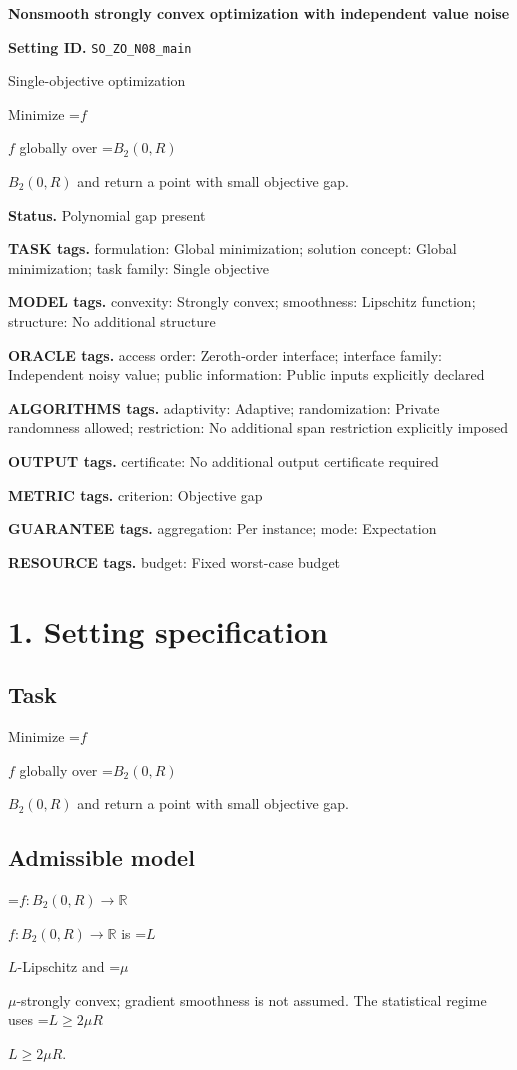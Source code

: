 \documentclass[10pt,a4paper]{article}
\newcommand{\AtlasMath}[1]{\par\begingroup\centering\setbox0=\hbox{$\displaystyle #1$}\ifdim\wd0>1.4\linewidth\typeout{ATLAS WIDE FORMULA: \the\wd0}\fi\ifdim\wd0>\linewidth\resizebox{\linewidth}{!}{\box0}\else\box0\fi\par\endgroup}
\newcommand{\AtlasInlineMath}[1]{\begingroup\setbox0=\hbox{$#1$}\ifdim\wd0>.4\linewidth\endgroup\AtlasMath{#1}\else\endgroup$#1$\fi}
\begin{document}
\raggedright

{\LARGE\bfseries\sffamily\color{AtlasNavy} Nonsmooth strongly convex optimization with independent value noise\par}\vspace{5pt}
\textbf{Setting ID.} \texttt{SO\_\allowbreak{}ZO\_\allowbreak{}N08\_\allowbreak{}main}

Single-objective optimization

Minimize \AtlasInlineMath{f} globally over \AtlasInlineMath{B_2(0,R)} and return a point with small objective gap.

\textbf{Status.} Polynomial gap present

\textbf{TASK tags.} formulation: Global minimization; solution concept: Global minimization; task family: Single objective

\textbf{MODEL tags.} convexity: Strongly convex; smoothness: Lipschitz function; structure: No additional structure

\textbf{ORACLE tags.} access order: Zeroth-order interface; interface family: Independent noisy value; public information: Public inputs explicitly declared

\textbf{ALGORITHMS tags.} adaptivity: Adaptive; randomization: Private randomness allowed; restriction: No additional span restriction explicitly imposed

\textbf{OUTPUT tags.} certificate: No additional output certificate required

\textbf{METRIC tags.} criterion: Objective gap

\textbf{GUARANTEE tags.} aggregation: Per instance; mode: Expectation

\textbf{RESOURCE tags.} budget: Fixed worst-case budget

\section{1. Setting specification}
\subsection{Task}
Minimize \AtlasInlineMath{f} globally over \AtlasInlineMath{B_2(0,R)} and return a point with small objective gap.

\subsection{Admissible model}
\AtlasInlineMath{f:B_2(0,R)\to\mathbb{R}} is \AtlasInlineMath{L}-Lipschitz and \AtlasInlineMath{\mu}-strongly convex; gradient smoothness is not assumed. The statistical regime uses \AtlasInlineMath{L\ge2\mu R}.
\end{document}
